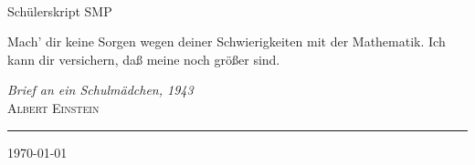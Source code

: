 \begin{titlepage}

\begin{center}
	\hfill  \\
	[3,5cm]

	\titlefont Schülerskript SMP\\
	[0,5cm]
\end{center}
\epigraph{Mach' dir keine Sorgen wegen deiner Schwierigkeiten mit der Mathematik. Ich kann dir versichern, daß meine noch größer sind.}
{\textit{Brief an ein Schulmädchen, 1943}\\ \textsc{Albert Einstein}}
\null\vfill
\vspace*{1cm}
\noindent
\hfill
\begin{minipage}{0.35\linewidth}
    \begin{flushright}
        \printauthor
    \end{flushright}
\end{minipage}
%
\begin{minipage}{0.02\linewidth}
    \rule{1pt}{100pt}
\end{minipage}
\titlepagedecoration
\begin{center}
	\small{\today} \\
\end{center}
\end{titlepage}
